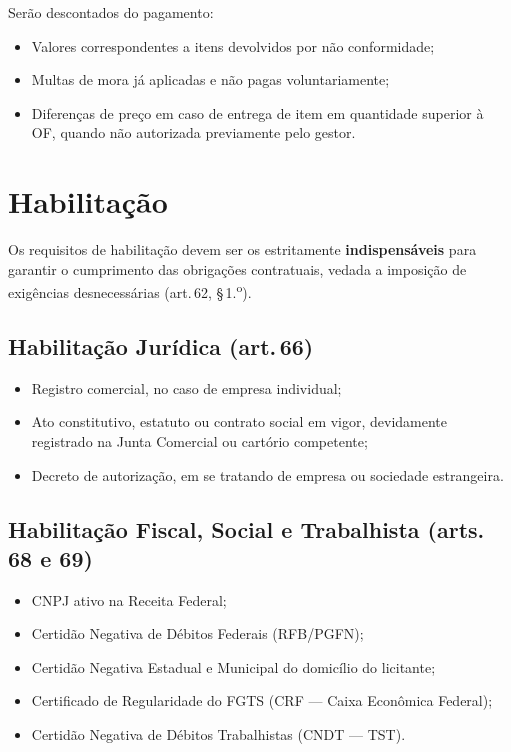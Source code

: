 \documentclass[12pt,a4paper]{article}
\newcommand{\art}[1]{art.\,#1}
\begin{document}
Serão descontados do pagamento:

\begin{itemize}
  \item Valores correspondentes a itens devolvidos por não conformidade;
  \item Multas de mora já aplicadas e não pagas voluntariamente;
  \item Diferenças de preço em caso de entrega de item em quantidade superior à OF,
    quando não autorizada previamente pelo gestor.
\end{itemize}

\section{Habilitação}

\begin{legalbox}
\small Os requisitos de habilitação devem ser os estritamente \textbf{indispensáveis}
para garantir o cumprimento das obrigações contratuais, vedada a imposição de
exigências desnecessárias (\art{62}, \S\,1.\textsuperscript{o}).
\end{legalbox}

\subsection{Habilitação Jurídica (\art{66})}

\begin{itemize}
  \item Registro comercial, no caso de empresa individual;
  \item Ato constitutivo, estatuto ou contrato social em vigor, devidamente registrado
    na Junta Comercial ou cartório competente;
  \item Decreto de autorização, em se tratando de empresa ou sociedade estrangeira.
\end{itemize}

\subsection{Habilitação Fiscal, Social e Trabalhista (arts. 68 e 69)}

\begin{itemize}
  \item CNPJ ativo na Receita Federal;
  \item Certidão Negativa de Débitos Federais (RFB/PGFN);
  \item Certidão Negativa Estadual e Municipal do domicílio do licitante;
  \item Certificado de Regularidade do FGTS (CRF --- Caixa Econômica Federal);
  \item Certidão Negativa de Débitos Trabalhistas (CNDT --- TST).
\end{itemize}
\end{document}
